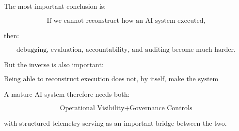 \documentclass[11pt,a4paper]{article}
\begin{document}
The most important conclusion is:

\[
\boxed{
\text{If we cannot reconstruct how an AI system executed,}
}
\]

then:

\[
\boxed{
\text{debugging, evaluation, accountability, and auditing become much harder.}
}
\]

But the inverse is also important:

\[
\boxed{
\text{Being able to reconstruct execution does not, by itself, make the system governed.}
}
\]

A mature AI system therefore needs both:

\[
\boxed{
\text{Operational Visibility} + \text{Governance Controls}
}
\]

with structured telemetry serving as an important bridge between the two.
\end{document}
